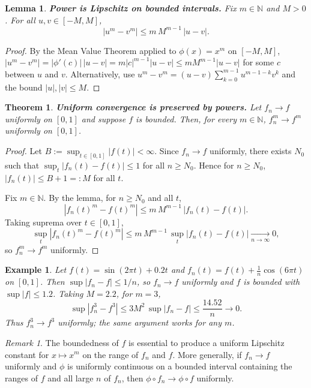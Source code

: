 \documentclass[11pt,a4paper]{article}
\newtheorem{theorem}{Theorem}
\newtheorem{example}{Example}
\theoremstyle{definition}
\theoremstyle{definition}
\theoremstyle{plain}
\newtheorem{lemma}[exercise]{Lemma}
\theoremstyle{remark}
\newtheorem{remark}[exercise]{Remark}
\begin{document}
\begin{lemma}
	\textbf{Power is Lipschitz on bounded intervals.}
	Fix $m\in\mathbb N$ and $M>0$. For all $u,v\in[-M,M]$,
	\[
	|u^m-v^m|\le m\,M^{m-1}\,|u-v|.
	\]
\end{lemma}

\begin{proof}
	By the Mean Value Theorem applied to $\phi(x)=x^m$ on $[-M,M]$,
	$|u^m-v^m|=|\phi'(c)|\,|u-v|=m|c|^{m-1}|u-v|\le mM^{m-1}|u-v|$ for some $c$
	between $u$ and $v$. Alternatively, use $u^m-v^m=(u-v)\sum_{k=0}^{m-1}
	u^{m-1-k}v^{k}$ and the bound $|u|,|v|\le M$.
\end{proof}

\begin{theorem}
	\textbf{Uniform convergence is preserved by powers.}
	Let $f_n\to f$ uniformly on $[0,1]$ and suppose $f$ is bounded. Then, for every
	$m\in\mathbb N$, $f_n^m\to f^m$ uniformly on $[0,1]$.
\end{theorem}

\begin{proof}
	Let $B:=\sup_{t\in[0,1]}|f(t)|<\infty$. Since $f_n\to f$ uniformly, there exists
	$N_0$ such that $\sup_{t}|f_n(t)-f(t)|\le 1$ for all $n\ge N_0$. Hence for
	$n\ge N_0$, $|f_n(t)|\le B+1=:M$ for all $t$.
	
	Fix $m\in\mathbb N$. By the lemma, for $n\ge N_0$ and all $t$,
	\[
	|f_n(t)^m-f(t)^m|\le m\,M^{m-1}\,|f_n(t)-f(t)|.
	\]
	Taking suprema over $t\in[0,1]$,
	\[
	\sup_{t}|f_n(t)^m-f(t)^m|\le m\,M^{m-1}\,\sup_{t}|f_n(t)-f(t)|
	\xrightarrow[n\to\infty]{}0,
	\]
	so $f_n^m\to f^m$ uniformly.
\end{proof}

\begin{example}
	Let $f(t)=\sin(2\pi t)+0.2t$ and $f_n(t)=f(t)+\frac{1}{n}\cos(6\pi t)$ on $[0,1]$.
	Then $\sup|f_n-f|\le 1/n$, so $f_n\to f$ uniformly and $f$ is bounded with
	$\sup|f|\le 1.2$. Taking $M=2.2$, for $m=3$,
	\[
	\sup|f_n^3-f^3|\le 3M^2\,\sup|f_n-f|\le \frac{14.52}{n}\to0.
	\]
	Thus $f_n^3\to f^3$ uniformly; the same argument works for any $m$.
\end{example}

\begin{remark}
	The boundedness of $f$ is essential to produce a uniform Lipschitz constant for
	$x\mapsto x^m$ on the range of $f_n$ and $f$. More generally, if $f_n\to f$
	uniformly and $\phi$ is uniformly continuous on a bounded interval containing
	the ranges of $f$ and all large $n$ of $f_n$, then $\phi\!\circ f_n\to\phi\!\circ f$
	uniformly.
\end{remark}
\end{document}
